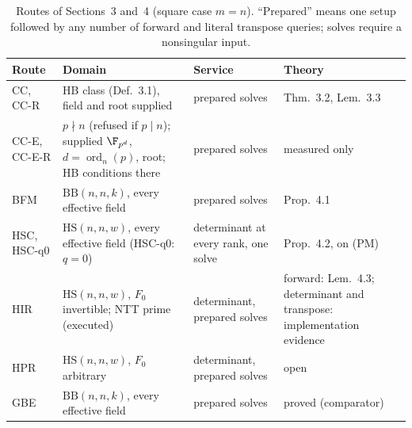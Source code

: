 \begin{table}[p]
\caption{Routes of Sections~3 and~4 (square case
$m=n$).  ``Prepared'' means one setup followed by any number of forward
and literal transpose queries; solves require a nonsingular input.}

\centering
\small
\begin{tabular}{@{}l>{\raggedright\arraybackslash}p{4.3cm}>{\raggedright\arraybackslash}p{3.2cm}>{\raggedright\arraybackslash}p{4.2cm}@{}}
\hline
Route & Domain & Service & Theory \\
\hline
CC, CC-R & HB class (Def.~3.1), field and root supplied & prepared solves & Thm.~3.2, Lem.~3.3 \\
CC-E, CC-E-R & $p\nmid n$ (refused if $p\mid n$); supplied $\F_{p^d}$, $d=\operatorname{ord}_n(p)$, root; HB conditions there & prepared solves & measured only \\
BFM & $\mathrm{BB}(n,n,k)$, every effective field & prepared solves & Prop.~4.1 \\
HSC, HSC-q0 & $\mathrm{HS}(n,n,w)$, every effective field (HSC-q0: $q=0$) & determinant at every rank, one solve & Prop.~4.2, on (PM) \\
HIR & $\mathrm{HS}(n,n,w)$, $F_0$ invertible; NTT prime (executed) & determinant, prepared solves & forward: Lem.~4.3; determinant and transpose: implementation evidence \\
HPR & $\mathrm{HS}(n,n,w)$, $F_0$ arbitrary & determinant, prepared solves & open \\
GBE & $\mathrm{BB}(n,n,k)$, every effective field & prepared solves & proved (comparator) \\
\hline
\end{tabular}
\end{table}
